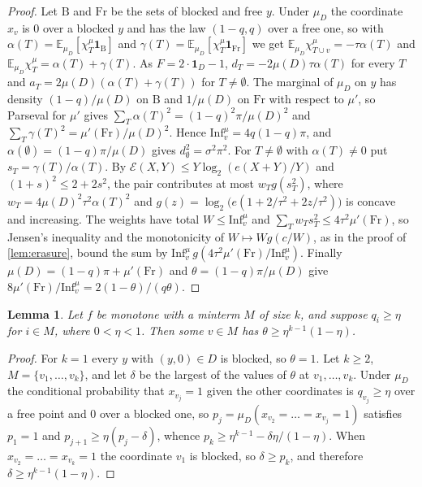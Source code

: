 \documentclass[11pt]{amsart}
\newtheorem{lemma}[theorem]{Lemma}
\theoremstyle{remark}
\newcommand{\E}{\mathbb{E}}
\newcommand{\Inf}{\mathrm{Inf}}
\begin{document}
\begin{proof}
Let $\mathrm B$ and $\mathrm{Fr}$ be the sets of blocked and free $y$. Under $\mu_D$ the coordinate $x_v$ is $0$ over a
blocked $y$ and has the law $(1-q,q)$ over a free one, so with $\alpha(T)=\E_{\mu_D}[\chi^\mu_T\mathbf 1_{\mathrm B}]$ and
$\gamma(T)=\E_{\mu_D}[\chi^\mu_T\mathbf 1_{\mathrm{Fr}}]$ we get $\E_{\mu_D}\chi^\mu_{T\cup v}=-\tau\alpha(T)$ and
$\E_{\mu_D}\chi^\mu_T=\alpha(T)+\gamma(T)$. As $F=2\cdot\mathbf 1_D-1$, $d_T=-2\mu(D)\tau\alpha(T)$ for every $T$ and
$a_T=2\mu(D)(\alpha(T)+\gamma(T))$ for $T\neq\emptyset$. The marginal of $\mu_D$ on $y$ has density $(1-q)/\mu(D)$ on
$\mathrm B$ and $1/\mu(D)$ on $\mathrm{Fr}$ with respect to $\mu'$, so Parseval for $\mu'$ gives
$\sum_T\alpha(T)^2=(1-q)^2\pi/\mu(D)^2$ and $\sum_T\gamma(T)^2=\mu'(\mathrm{Fr})/\mu(D)^2$. Hence
$\Inf^\mu_v=4q(1-q)\pi$, and $\alpha(\emptyset)=(1-q)\pi/\mu(D)$ gives $d_\emptyset^2=\sigma^2\pi^2$. For $T\neq\emptyset$
with $\alpha(T)\neq0$ put $s_T=\gamma(T)/\alpha(T)$. By $\mathcal E(X,Y)\le Y\log_2(e(X+Y)/Y)$ and $(1+s)^2\le2+2s^2$, the
pair contributes at most $w_Tg(s_T^2)$, where $w_T=4\mu(D)^2\tau^2\alpha(T)^2$ and
$g(z)=\log_2\bigl(e(1+2/\tau^2+2z/\tau^2)\bigr)$ is concave and increasing. The weights have total $W\le\Inf^\mu_v$ and
$\sum_Tw_Ts_T^2\le4\tau^2\mu'(\mathrm{Fr})$, so Jensen's inequality and the monotonicity of $W\mapsto Wg(c/W)$, as in the
proof of \cref{lem:erasure}, bound the sum by $\Inf^\mu_v\,g(4\tau^2\mu'(\mathrm{Fr})/\Inf^\mu_v)$. Finally
$\mu(D)=(1-q)\pi+\mu'(\mathrm{Fr})$ and $\theta=(1-q)\pi/\mu(D)$ give $8\mu'(\mathrm{Fr})/\Inf^\mu_v=2(1-\theta)/(q\theta)$.
\end{proof}

\begin{lemma}\label{lem:biasedcert}
Let $f$ be monotone with a minterm $M$ of size $k$, and suppose $q_i\ge\eta$ for $i\in M$, where $0<\eta<1$. Then some
$v\in M$ has $\theta\ge\eta^{k-1}(1-\eta)$.
\end{lemma}

\begin{proof}
For $k=1$ every $y$ with $(y,0)\in D$ is blocked, so $\theta=1$. Let $k\ge2$, $M=\{v_1,\dots,v_k\}$, and let $\delta$ be
the largest of the values of $\theta$ at $v_1,\dots,v_k$. Under $\mu_D$ the conditional probability that $x_{v_j}=1$
given the other coordinates is $q_{v_j}\ge\eta$ over a free point and $0$ over a blocked one, so
$p_j=\mu_D(x_{v_2}=\dots=x_{v_j}=1)$ satisfies $p_1=1$ and $p_{j+1}\ge\eta(p_j-\delta)$, whence
$p_k\ge\eta^{k-1}-\delta\eta/(1-\eta)$. When $x_{v_2}=\dots=x_{v_k}=1$ the coordinate $v_1$ is blocked, so $\delta\ge p_k$,
and therefore $\delta\ge\eta^{k-1}(1-\eta)$.
\end{proof}
\end{document}
